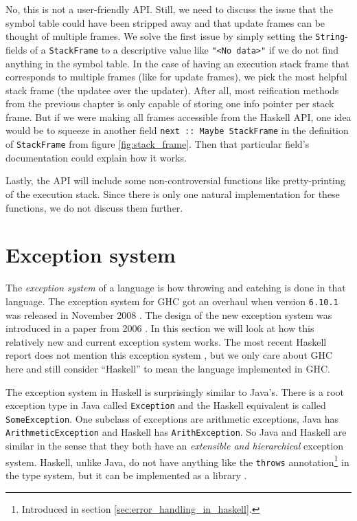 No, this is not a user-friendly API. Still, we need to discuss the issue
that the symbol table could have been stripped away and that update
frames can be thought of multiple frames. We solve the first issue by
simply setting the \texttt{String}-fields of a \texttt{StackFrame} to
a descriptive value like \texttt{"<No data>"} if we do not find anything
in the symbol table. In the case of having an
execution stack frame that corresponds to multiple
frames (like for update frames), we pick the most helpful stack frame
(the updatee over the updater).
After all, most reification methods from the previous chapter is only
capable of storing one info pointer per stack frame. But if we were
making all frames accessible from the Haskell API, one idea would be
to squeeze in another field \texttt{next :: Maybe StackFrame} in the
definition of \texttt{StackFrame} from figure \ref{fig:stack_frame}.
Then that particular field's documentation could explain how it works.

Lastly, the API will include some non-controversial functions like
pretty-printing of the execution stack.  Since there is only one natural
implementation for these functions, we do not discuss them further.

\section{Exception system} \label{sec:exception_system}

The \emph{exception system} of a language is how throwing and catching
is done in that language. The exception system for GHC got an
overhaul when version \texttt{6.10.1} was released in November 2008
\cite{haskell_org_release_6.10.1}. The design of the new exception
system was introduced in a paper from 2006 \cite{marlow2006extensible}.
In this section we will look at how this relatively new and current
exception system works. The most recent Haskell report does not mention
this exception system \cite[ch. 42]{haskell_report2010}, but we only
care about GHC here and still consider ``Haskell'' to mean the language
implemented in GHC.

The exception system in Haskell is surprisingly similar to
Java's.  There is a root exception type in Java called \texttt{Exception}
and the Haskell equivalent is called \texttt{SomeException}. One
subclass of exceptions are arithmetic exceptions, Java has
\texttt{ArithmeticException} and Haskell has \texttt{ArithException}.
So Java and Haskell are similar in the sense that they both have an
\emph{extensible and hierarchical} exception system.  Haskell, unlike
Java, do not have anything like the \texttt{throws}
annotation\footnote{Introduced in section
\ref{sec:error_handling_in_haskell}.}
in the type system, but it can be implemented as a library
\cite{github_pepeiborra_cme, hackage_control_monad_exception}.

